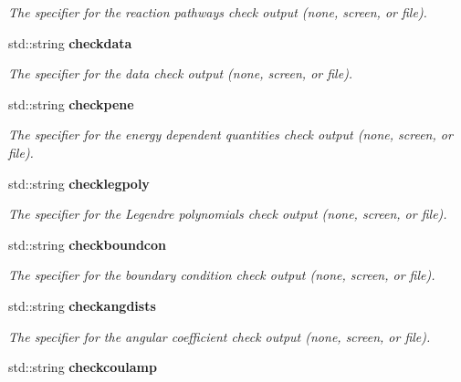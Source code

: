 \begin{CompactItemize}
\begin{CompactList}\small\item\em The specifier for the reaction pathways check output (none, screen, or file). \item\end{CompactList}\item 
std::string \bf{checkdata}\label{structConfig_299034194ce320bd3533935026ff8c60}

\begin{CompactList}\small\item\em The specifier for the data check output (none, screen, or file). \item\end{CompactList}\item 
std::string \bf{checkpene}\label{structConfig_d48d741600270723fc98973ee2703e93}

\begin{CompactList}\small\item\em The specifier for the energy dependent quantities check output (none, screen, or file). \item\end{CompactList}\item 
std::string \bf{checklegpoly}\label{structConfig_5d1ebe763cfc03d9390e696d6ab295d3}

\begin{CompactList}\small\item\em The specifier for the Legendre polynomials check output (none, screen, or file). \item\end{CompactList}\item 
std::string \bf{checkboundcon}\label{structConfig_d1be72c446c83a263df84f2e52780f7c}

\begin{CompactList}\small\item\em The specifier for the boundary condition check output (none, screen, or file). \item\end{CompactList}\item 
std::string \bf{checkangdists}\label{structConfig_4439469c56f76f4031eb50d598422b45}

\begin{CompactList}\small\item\em The specifier for the angular coefficient check output (none, screen, or file). \item\end{CompactList}\item 
std::string \bf{checkcoulamp}\label{structConfig_073756c433f9ed2be30631a9724e3f24}


\end{CompactItemize}

